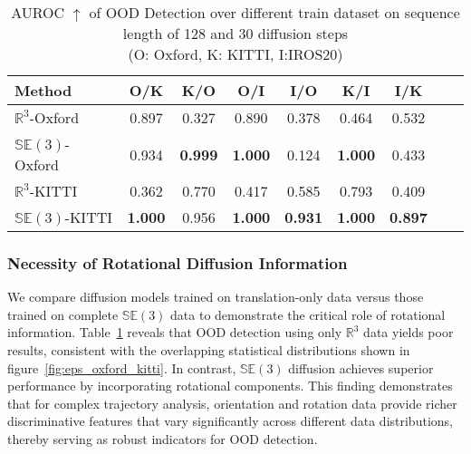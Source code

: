 \begin{table}[t]
    \caption{AUROC $\uparrow$ of OOD Detection over different train dataset on sequence length of 128 and 30 diffusion steps\\
    (O: Oxford, K: KITTI, I:IROS20)}
    \vskip 0.15in
\begin{adjustbox}{width=0.68\linewidth,center}
    \begin{tabular}{lcccccccc}
    \toprule
        \textbf{Method} & \textbf{O/K} & \textbf{K/O} & \textbf{O/I} & \textbf{I/O} & \textbf{K/I} & \textbf{I/K}\\
    \midrule
        $\mathbb{R}^{3}$-Oxford  & 0.897 & 0.327 & 0.890 & 0.378 & 0.464 & 0.532\\
        $\mathbb{SE}(3)$-Oxford  & 0.934 & \textbf{0.999} & \textbf{1.000} & 0.124 & \textbf{1.000} & 0.433\\
    \midrule
        $\mathbb{R}^{3}$-KITTI  & 0.362 & 0.770 & 0.417 & 0.585 & 0.793 & 0.409\\
        $\mathbb{SE}(3)$-KITTI  & \textbf{1.000} & 0.956 & \textbf{1.000} & \textbf{0.931} & \textbf{1.000} & \textbf{0.897}\\
    \bottomrule
    \end{tabular}
    \end{adjustbox}
    \vskip -0.1in
    \label{tab:ablation_dataset}
\end{table}

\subsubsection{Necessity of Rotational Diffusion Information}
We compare diffusion models trained on translation-only data versus those trained on complete $\mathbb{SE}(3)$ data to demonstrate the critical role of rotational information. Table~\ref{tab:ablation_dataset} reveals that OOD detection using only $\mathbb{R}^{3}$ data yields poor results, consistent with the overlapping statistical distributions shown in figure~\ref{fig:eps_oxford_kitti}. In contrast, $\mathbb{SE}(3)$ diffusion achieves superior performance by incorporating rotational components. This finding demonstrates that for complex trajectory analysis, orientation and rotation data provide richer discriminative features that vary significantly across different data distributions, thereby serving as robust indicators for OOD detection.

